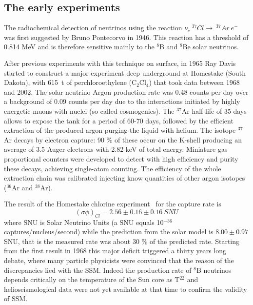 \subsection{The early experiments}

The radiochemical detection of neutrinos using the reaction 
$\nu_e~^{37}Cl\rightarrow~^{37}Ar~e^-$ was first suggested by Bruno Pontecorvo in 1946\cite{pontecorvo46}. This reaction has a threshold of 0.814 MeV and is therefore sensitive mainly to the $^8$B and $^8$Be solar neutrinos.

After previous experiments with this technique on surface, in 1965 Ray  Davis started  to construct a major experiment deep underground at Homestake (South Dakota), with 615~t of perchloroethylene (C$_2$Cl$_4$) that took data between 1968 and 2002.
The solar neutrino Argon production rate was 0.48 counts per day over a background of 0.09 counts per day due to the interactions initiated by highly energetic muons with nuclei (so called cosmogenics).
The $^{37}$Ar half-life of 35 days allows to expose the tank for a period of 60-70 days, followed by the efficient extraction of the produced argon purging the liquid with helium.  
The isotope $^{37}$Ar decays by electron capture: 90 \% of these occur on the K-shell producing an average of 3.5 Auger electrons with 2.82 keV of total energy. Miniature gas proportional counters were developed to detect with high efficiency and purity these decays, achieving single-atom counting.
The efficiency of the whole extraction chain was calibrated injecting know quantities of other argon isotopes ($^{36}$Ar and $^{38}$Ar).  

The result of the Homestake chlorine experiment~\cite{cleveland} for the capture rate  is
\begin{equation}
(\sigma \phi)_{Cl} = 2.56 \pm 0.16 \pm 0.16 \: SNU
\end{equation}
where SNU is Solar Neutrino Units (a SNU equals 10$^{-36}$ captures/nucleus/second) while the prediction from the solar model is $8.00 \pm 0.97$ SNU, that is the measured rate was about 30 \% of the predicted rate.  
Starting from the first result in 1968 this major deficit triggered a thirty years long debate, where many particle physicists were convinced that the reason of the discrepancies lied with the SSM. Indeed the production rate of $ {^8}$B neutrinos depends critically on the temperature of the Sun core as T$^{22}$ and helioseismological data were not yet available at that time to confirm the validity of SSM. 

